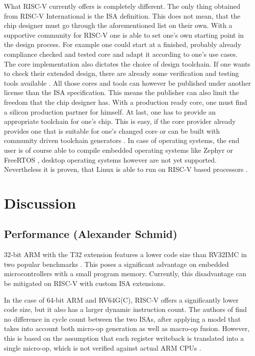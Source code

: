 \documentclass[conference]{IEEEtran}
\begin{document}
	What RISC-V currently offers is completely different. The only thing obtained from RISC-V International is the \gls{ISA} definition. This does not mean, that the chip designer must go through the aforementioned list on their own. With a supportive community for RISC-V one is able to set one's own starting point in the design process. For example one could start at a finished, probably already compliance checked and tested core \cite{RVCores} and adapt it according to one's use cases. The core implementation also dictates the choice of design toolchain. If one wants to check their extended design, there are already some verification and testing tools available \cite{Bartley2020}. All those cores and tools can however be published under another license than the \gls{ISA} specification. This means the publisher can also limit the freedom that the chip designer has. With a production ready core, one must find a silicon production partner for himself.
	At last, one has to provide an appropriate toolchain for one's chip. This is easy, if the core provider already provides one \cite{SiFive} that is suitable for one's changed core or can be built with community driven toolchain generators \cite{NG}.
	In case of operating systems, the end user is of course able to compile embedded operating systems like Zephyr \cite{LinuxFoundation} or FreeRTOS \cite{Aws2020}, desktop operating systems however are not yet supported. Nevertheless it is proven, that Linux is able to run on RISC-V based processors \cite{SiFivea}.

\section{Discussion}
\label{ref:discussion}

	\subsection{Performance (Alexander Schmid)}
	32-bit ARM with the T32 extension features a lower code size than RV32IMC in two popular benchmarks \cite{Perotti2020}.
	This poses a significant advantage on embedded microcontrollers with a small program memory.
	Currently, this disadvantage can be mitigated on RISC-V with custom ISA extensions.

	In the case of 64-bit ARM and RV64G(C), RISC-V offers a significantly lower code size, but it also has a larger
	dynamic instruction count. The authors of \cite{Celio2016} find no difference in cycle count
	between the two \glspl{ISA}, after applying a model that takes into account both micro-op generation as well as macro-op fusion.
	However, this is based on the assumption that each register writeback is translated into a single micro-op,
	which is not verified against actual ARM \glspl{CPU} \cite[slide 40]{Celio2016}.
\end{document}
